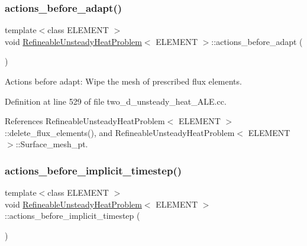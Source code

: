 \mbox{\label{classRefineableUnsteadyHeatProblem_a4419fcea0ccbf0509f1d5dd37d8301de}} 
\subsubsection{\texorpdfstring{actions\+\_\+before\+\_\+adapt()}{actions\_before\_adapt()}}
{\footnotesize\ttfamily template$<$class E\+L\+E\+M\+E\+NT $>$ \\
void \hyperlink{classRefineableUnsteadyHeatProblem}{Refineable\+Unsteady\+Heat\+Problem}$<$ E\+L\+E\+M\+E\+NT $>$\+::actions\+\_\+before\+\_\+adapt (\begin{DoxyParamCaption}{ }\end{DoxyParamCaption})}



Actions before adapt\+: Wipe the mesh of prescribed flux elements. 



Definition at line 529 of file two\+\_\+d\+\_\+unsteady\+\_\+heat\+\_\+\+A\+L\+E.\+cc.



References Refineable\+Unsteady\+Heat\+Problem$<$ E\+L\+E\+M\+E\+N\+T $>$\+::delete\+\_\+flux\+\_\+elements(), and Refineable\+Unsteady\+Heat\+Problem$<$ E\+L\+E\+M\+E\+N\+T $>$\+::\+Surface\+\_\+mesh\+\_\+pt.

\mbox{\label{classRefineableUnsteadyHeatProblem_ac754f1313cd6d684c149443beb5bcf9e}} 
\subsubsection{\texorpdfstring{actions\+\_\+before\+\_\+implicit\+\_\+timestep()}{actions\_before\_implicit\_timestep()}}
{\footnotesize\ttfamily template$<$class E\+L\+E\+M\+E\+NT $>$ \\
void \hyperlink{classRefineableUnsteadyHeatProblem}{Refineable\+Unsteady\+Heat\+Problem}$<$ E\+L\+E\+M\+E\+NT $>$\+::actions\+\_\+before\+\_\+implicit\+\_\+timestep (\begin{DoxyParamCaption}{ }\end{DoxyParamCaption})}



